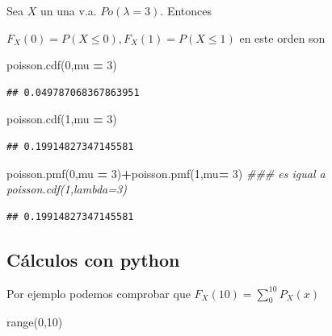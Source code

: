 \documentclass[]{book}
\newenvironment{Shaded}{\begin{snugshade}}{\end{snugshade}}
\newcommand{\BuiltInTok}[1]{#1}
\newcommand{\CommentTok}[1]{\textcolor[rgb]{0.56,0.35,0.01}{\textit{#1}}}
\newcommand{\DecValTok}[1]{\textcolor[rgb]{0.00,0.00,0.81}{#1}}
\newcommand{\NormalTok}[1]{#1}
\newcommand{\OperatorTok}[1]{\textcolor[rgb]{0.81,0.36,0.00}{\textbf{#1}}}
\begin{document}
Sea \(X\) un una v.a. \(Po(\lambda=3)\). Entonces

\(F_X(0)=P(X\leq 0), F_X(1)=P(X\leq 1)\) en este orden son

\begin{Shaded}
\begin{Highlighting}[]
\NormalTok{poisson.cdf(}\DecValTok{0}\NormalTok{,mu }\OperatorTok{=} \DecValTok{3}\NormalTok{)}
\end{Highlighting}
\end{Shaded}

\begin{verbatim}
## 0.049787068367863951
\end{verbatim}

\begin{Shaded}
\begin{Highlighting}[]
\NormalTok{poisson.cdf(}\DecValTok{1}\NormalTok{,mu }\OperatorTok{=} \DecValTok{3}\NormalTok{)}
\end{Highlighting}
\end{Shaded}

\begin{verbatim}
## 0.19914827347145581
\end{verbatim}

\begin{Shaded}
\begin{Highlighting}[]
\NormalTok{poisson.pmf(}\DecValTok{0}\NormalTok{,mu }\OperatorTok{=} \DecValTok{3}\NormalTok{)}\OperatorTok{+}\NormalTok{poisson.pmf(}\DecValTok{1}\NormalTok{,mu}\OperatorTok{=} \DecValTok{3}\NormalTok{) }\CommentTok{### es igual a poisson.cdf(1,lambda=3)}
\end{Highlighting}
\end{Shaded}

\begin{verbatim}
## 0.19914827347145581
\end{verbatim}

\hypertarget{cuxe1lculos-con-python-8}{%
\subsection{Cálculos con python}\label{cuxe1lculos-con-python-8}}

Por ejemplo podemos comprobar que \(F_X(10)=\displaystyle\sum_{0}^{10} P_X(x)\)

\begin{Shaded}
\begin{Highlighting}[]
\BuiltInTok{range}\NormalTok{(}\DecValTok{0}\NormalTok{,}\DecValTok{10}\NormalTok{)}
\end{Highlighting}
\end{Shaded}
\end{document}
